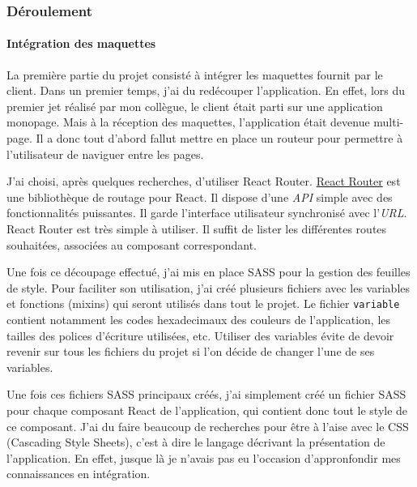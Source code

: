 \documentclass[12pt,a4paper]{article}
\begin{document}
  \bigskip

  \subsubsection{Déroulement}\label{duxe9roulement}

  \bigskip

  \paragraph{Intégration des
  maquettes}\label{intuxe9gration-des-maquettes}

  \bigskip

  La première partie du projet consisté à intégrer les maquettes fournit
  par le client. Dans un premier temps, j'ai du redécouper l'application.
  En effet, lors du premier jet réalisé par mon collègue, le client était
  parti sur une application monopage. Mais à la réception des maquettes,
  l'application était devenue multi-page. Il a donc tout d'abord fallut
  mettre en place un routeur pour permettre à l'utilisateur de naviguer
  entre les pages.

  \bigskip

  J'ai choisi, après quelques recherches, d'utiliser React Router.
  \href{https://github.com/ReactTraining/react-router}{React Router} est
  une bibliothèque de routage pour React. Il dispose d'une \emph{API}
  simple avec des fonctionnalités puissantes. Il garde l'interface
  utilisateur synchronisé avec l'\emph{URL}. React Router est très simple
  à utiliser. Il suffit de lister les différentes routes souhaitées,
  associées au composant correspondant.

  \bigskip

  Une fois ce découpage effectué, j'ai mis en place SASS pour la gestion
  des feuilles de style. Pour faciliter son utilisation, j'ai créé
  plusieurs fichiers avec les variables et fonctions (mixins) qui seront
  utilisés dans tout le projet. Le fichier \texttt{variable} contient
  notamment les codes hexadecimaux des couleurs de l'application, les
  tailles des polices d'écriture utilisées, etc. Utiliser des variables
  évite de devoir revenir sur tous les fichiers du projet si l'on décide
  de changer l'une de ses variables.

  \bigskip

  Une fois ces fichiers SASS principaux créés, j'ai simplement créé un
  fichier SASS pour chaque composant React de l'application, qui contient
  donc tout le style de ce composant. J'ai du faire beaucoup de recherches
  pour être à l'aise avec le CSS (Cascading Style Sheets), c'est à dire le
  langage décrivant la présentation de l'application. En effet, jusque là
  je n'avais pas eu l'occasion d'appronfondir mes connaissances en
  intégration.
\end{document}
